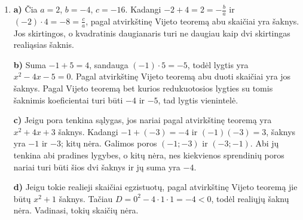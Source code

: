 \documentclass[12pt,a4paper]{article}
\begin{document}
\begin{enumerate}
\textbf{1 atvejis.} $S=5$, $T=6$. Tuomet $x+y=5$, $xy=6$, todėl $x$ ir $y$ yra $t^2-5t+6$ šaknys: $2$ ir $3$. Gauname poras $(2;3)$ ir $(3;2)$.

\textbf{2 atvejis.} $S=6$, $T=5$. Tuomet $x+y=6$, $xy=5$, todėl $x$ ir $y$ yra $t^2-6t+5$ šaknys: $1$ ir $5$. Gauname poras $(1;5)$ ir $(5;1)$.

\textbf{Patikra.} Pirmųjų dviejų porų narių suma ir sandauga yra $5$ ir $6$, todėl $x+y+xy=5+6=11$, o $x^2y+xy^2=6\cdot5=30$. Kitų dviejų porų suma ir sandauga yra $6$ ir $5$, todėl gauname $6+5=11$ ir $5\cdot6=30$. Visos keturios poros tinka. Kitų nėra, nes išnagrinėjome abu galimus $S$ ir $T$ ir kiekvienu atveju visas jų šaknų poras.
\item \textbf{a)} Čia $a=2$, $b=-4$, $c=-16$. Kadangi $-2+4=2=-\frac ba$ ir $(-2)\cdot4=-8=\frac ca$, pagal atvirkštinę Vijeto teoremą abu skaičiai yra šaknys. Jos skirtingos, o kvadratinis daugianaris turi ne daugiau kaip dvi skirtingas realiąsias šaknis.

\textbf{b)} Suma $-1+5=4$, sandauga $(-1)\cdot5=-5$, todėl lygtis yra $x^2-4x-5=0$. Pagal atvirkštinę Vijeto teoremą abu duoti skaičiai yra jos šaknys. Pagal Vijeto teoremą bet kurios redukuotosios lygties su tomis šaknimis koeficientai turi būti $-4$ ir $-5$, tad lygtis vienintelė.

\textbf{c)} Jeigu pora tenkina sąlygas, jos nariai pagal atvirkštinę teoremą yra $x^2+4x+3$ šaknys. Kadangi $-1+(-3)=-4$ ir $(-1)(-3)=3$, šaknys yra $-1$ ir $-3$; kitų nėra. Galimos poros $(-1;-3)$ ir $(-3;-1)$. Abi jų tenkina abi pradines lygybes, o kitų nėra, nes kiekvienos sprendinių poros nariai turi būti šios dvi šaknys ir jų suma yra $-4$.

\textbf{d)} Jeigu tokie realieji skaičiai egzistuotų, pagal atvirkštinę Vijeto teoremą jie būtų $x^2+1$ šaknys. Tačiau $D=0^2-4\cdot1\cdot1=-4<0$, todėl realiųjų šaknų nėra. Vadinasi, tokių skaičių nėra.
\end{enumerate}
\end{document}
